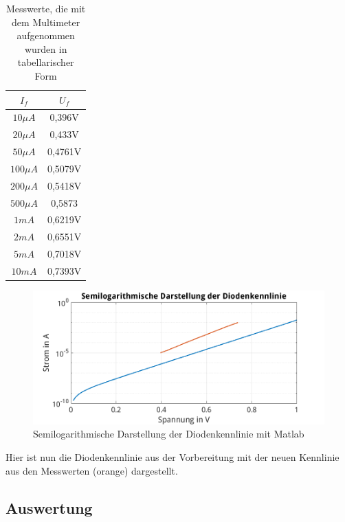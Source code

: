 \documentclass{article}
\begin{document}
\begin{table}[h]
  \begin{center}
\begin{tabular}{|c|c|}
  \hline
  $I_{f}$ & $U_{f}$  \\
  \hline
  $10\mu A$ & 0,396V\\
  \hline
  $20\mu A$ & 0,433V\\
  \hline
  $50\mu A$ & 0,4761V\\
  \hline
  $100\mu A$ & 0,5079V\\
  \hline
  $200\mu A$ & 0,5418V\\
  \hline
  $500\mu A$ & 0,5873\\
  \hline
  $1mA$ & 0,6219V\\
  \hline
  $2mA$ & 0,6551V\\
  \hline
  $5mA$ & 0,7018V\\
  \hline
  $10mA$ & 0,7393V\\
  \hline
\end{tabular}
\caption{Messwerte, die mit dem Multimeter aufgenommen wurden in tabellarischer Form}
\end{center}
\end{table}

\begin{figure}[h]
  \begin{center}
    \includegraphics[scale=0.6]{../assets/images/EL1P2/SemilogDiodeVergleich.png}
    \caption{Semilogarithmische Darstellung der Diodenkennlinie mit Matlab}
  \end{center}
\end{figure}

Hier ist nun die Diodenkennlinie aus der Vorbereitung mit der neuen Kennlinie aus den Messwerten (orange) dargestellt.
\newpage
\subsection{Auswertung}
\end{document}
